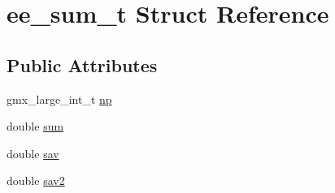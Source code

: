\hypertarget{structee__sum__t}{\section{ee\-\_\-sum\-\_\-t \-Struct \-Reference}
\label{structee__sum__t}
}
\subsection*{\-Public \-Attributes}
\begin{DoxyCompactItemize}
\item 
gmx\-\_\-large\-\_\-int\-\_\-t \hyperlink{structee__sum__t_afc98ac8aa79873c6568d33ab168a11f1}{np}
\item 
double \hyperlink{structee__sum__t_a32c4832afef746c7beb768ee0af9da99}{sum}
\item 
double \hyperlink{structee__sum__t_a24ec606cf09127b741dca9739ac78d0d}{sav}
\item 
double \hyperlink{structee__sum__t_a8ddea3841a5cc291cb160222727d39c9}{sav2}
\end{DoxyCompactItemize}


